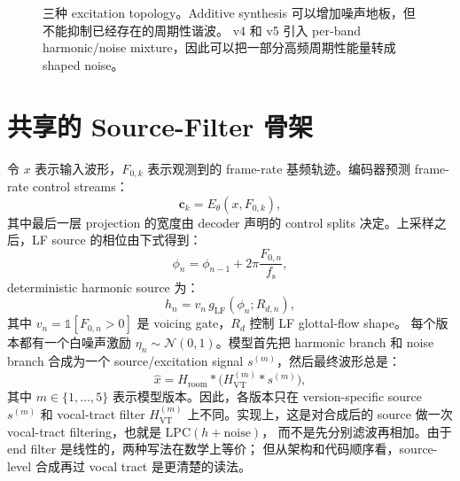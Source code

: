 \documentclass[11pt,fontset=none]{ctexart}
\newcommand{\fs}{f_{\mathrm{s}}}
\newcommand{\src}{s}
\newcommand{\harm}{h}
\newcommand{\noise}{\eta}
\newcommand{\vt}{H_{\mathrm{VT}}}
\newcommand{\room}{H_{\mathrm{room}}}
\newcommand{\lf}{g_{\mathrm{LF}}}
\begin{document}
\begin{figure}[H]
{}
\caption{三种 excitation topology。Additive synthesis 可以增加噪声地板，但不能抑制已经存在的周期性谐波。
v4 和 v5 引入 per-band harmonic/noise mixture，因此可以把一部分高频周期性能量转成 shaped noise。}
\label{fig:excitation-zh}
\end{figure}

\section{共享的 Source-Filter 骨架}

令 $x$ 表示输入波形，$F_{0,k}$ 表示观测到的 frame-rate 基频轨迹。编码器预测 frame-rate control streams：
\begin{equation}
  \mathbf{c}_k = E_\theta(x, F_{0,k}),
\end{equation}
其中最后一层 projection 的宽度由 decoder 声明的 control splits 决定。上采样之后，LF source 的相位由下式得到：
\begin{equation}
  \phi_n = \phi_{n-1} + 2\pi \frac{F_{0,n}}{\fs},
\end{equation}
deterministic harmonic source 为：
\begin{equation}
  \harm_n = v_n \, \lf(\phi_n; R_{d,n}),
\end{equation}
其中 $v_n=\mathbb{1}[F_{0,n}>0]$ 是 voicing gate，$R_d$ 控制 LF glottal-flow shape。
每个版本都有一个白噪声激励 $\noise_n\sim\mathcal{N}(0,1)$。模型首先把 harmonic branch
和 noise branch 合成为一个 source/excitation signal $\src^{(m)}$，然后最终波形总是：
\begin{equation}
  \hat{x} = \room * \bigl(\vt^{(m)} * \src^{(m)}\bigr),
\end{equation}
其中 $m\in\{1,\ldots,5\}$ 表示模型版本。因此，各版本只在 version-specific source
$\src^{(m)}$ 和 vocal-tract filter $\vt^{(m)}$ 上不同。实现上，这是对合成后的 source
做一次 vocal-tract filtering，也就是 $\mathrm{LPC}(\harm+\mathrm{noise})$，
而不是先分别滤波再相加。由于 end filter 是线性的，两种写法在数学上等价；
但从架构和代码顺序看，source-level 合成再过 vocal tract 是更清楚的读法。
\end{document}
